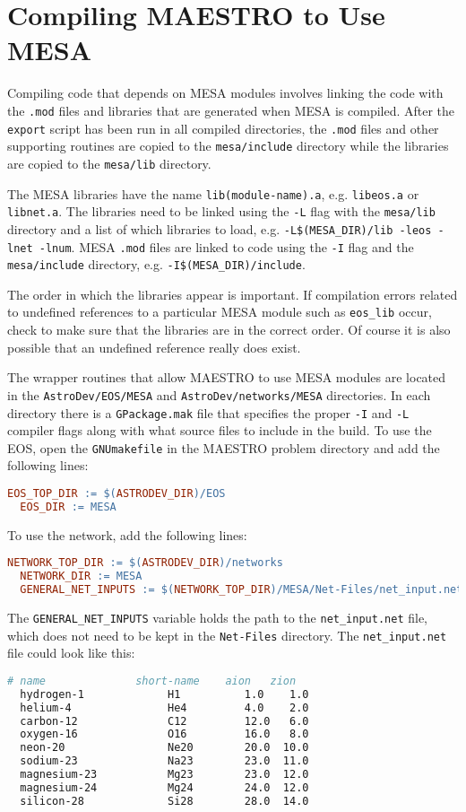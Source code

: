 \section{Compiling {\sf MAESTRO} to Use {\sf MESA}}

Compiling code that depends on {\sf MESA} modules involves linking the code 
with the {\tt .mod} files and libraries that are generated when {\sf MESA} 
is compiled. After the {\tt export} script has been run in all compiled 
directories, the {\tt .mod} files and other supporting routines are 
copied to the {\tt mesa/include} directory while the libraries are copied to 
the {\tt mesa/lib} directory.

The {\sf MESA} libraries have the name {\tt lib(module-name).a}, e.g. 
{\tt libeos.a} or {\tt libnet.a}. The libraries need to be linked using the 
{\tt -L} flag with the {\tt mesa/lib} directory and a list of which libraries 
to load, e.g. {\tt -L\$(MESA\_DIR)/lib -leos -lnet -lnum}. {\sf MESA} 
{\tt .mod} files are linked to code using the {\tt -I} flag and the 
{\tt mesa/include} directory, e.g. {\tt -I\$(MESA\_DIR)/include}. 

The order in which the libraries appear is important. If compilation errors 
related to undefined references to a particular {\sf MESA} module such as 
{\tt eos\_lib} occur, check to make sure that the libraries are in the correct 
order. Of course it is also possible that an undefined reference really does 
exist.

The wrapper routines that allow {\sf MAESTRO} to use {\sf MESA} modules are 
located in the {\tt AstroDev/EOS/MESA} and {\tt AstroDev/networks/MESA} 
directories. In each directory there is a {\tt GPackage.mak} file that 
specifies the proper {\tt -I} and {\tt -L} compiler flags along with what 
source files to include in the build. To use the EOS, open the 
{\tt GNUmakefile} in the {\sf MAESTRO} problem directory and add the 
following lines:
\begin{lstlisting}[language=make,mathescape=false]
  EOS_TOP_DIR := $(ASTRODEV_DIR)/EOS
  EOS_DIR := MESA
\end{lstlisting}
To use the network, add the following lines:
\begin{lstlisting}[language=make,mathescape=false]
  NETWORK_TOP_DIR := $(ASTRODEV_DIR)/networks
  NETWORK_DIR := MESA
  GENERAL_NET_INPUTS := $(NETWORK_TOP_DIR)/MESA/Net-Files/net_input.net
\end{lstlisting}
The {\tt GENERAL\_NET\_INPUTS} variable holds the path to the
{\tt net\_input.net} file, which does not need to be kept in the
{\tt Net-Files} directory. The {\tt net\_input.net} file could look like this:
\begin{lstlisting}[language=make,mathescape=false]
  # name              short-name    aion   zion
  hydrogen-1             H1          1.0    1.0
  helium-4               He4         4.0    2.0
  carbon-12              C12         12.0   6.0
  oxygen-16              O16         16.0   8.0
  neon-20                Ne20        20.0  10.0
  sodium-23              Na23        23.0  11.0
  magnesium-23           Mg23        23.0  12.0
  magnesium-24           Mg24        24.0  12.0
  silicon-28             Si28        28.0  14.0
\end{lstlisting}


